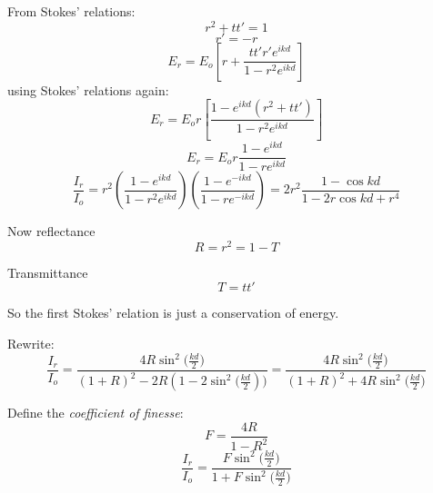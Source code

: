 \documentclass[10pt]{article}
\begin{document}
From Stokes' relations:
\begin{equation*}
r^2 + tt' = 1
\end{equation*}
\begin{equation*}
r' = -r
\end{equation*}
\begin{equation*}
E_r = E_o \left[ r + \frac{tt'r'e^{ikd}}{1 - r^2 e^{ikd}} \right]
\end{equation*}
using Stokes' relations again:
\begin{equation*}
E_r = E_o r \left[\frac{1 - e^{ikd}(r^2 + tt')}{1 - r^2 e^{ikd}} \right]
\end{equation*}
\begin{equation*}
E_r = E_o r \frac{1 - e^{ikd}}{1 - re^{ikd}}
\end{equation*}
\begin{equation*}
\frac{I_r}{I_o} = r^2 \left(\frac{1 - e^{ikd}}{1 - r^2e^{ikd}}\right) \left(\frac{1 - e^{-ikd}}{1 - re^{-ikd}} \right) = 2r^2 \frac{1 - \cos{kd}}{1 - 2r\cos{kd} + r^4}
\end{equation*}

Now reflectance
\begin{equation*}
R = r^2 = 1-T
\end{equation*}

Transmittance
\begin{equation*}
T = tt'
\end{equation*}

So the first Stokes' relation is just a conservation of energy.

Rewrite:
\begin{equation*}
\frac{I_r}{I_o} = \frac{4R\sin^2{(\frac{kd}{2}})}{(1 + R)^2 - 2R(1 - 2 \sin^2{(\frac{kd}{2}}))} = \frac{4R\sin^2{(\frac{kd}{2}})}{(1 + R)^2 + 4R\sin^2{(\frac{kd}{2}})}
\end{equation*}

Define the \textit{coefficient of finesse}:
\begin{equation}\boxed{
F = \frac{4R}{1 - R^2}
}\end{equation}
\begin{equation*}
\frac{I_r}{I_o} = \frac{F\sin^2{(\frac{kd}{2}})}{1 + F\sin^2{(\frac{kd}{2}})}
\end{equation*}
\end{document}
